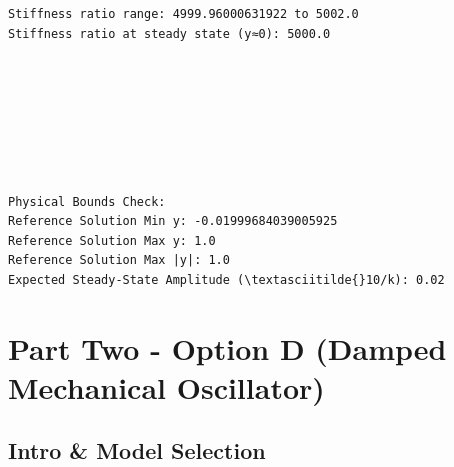 \documentclass[11pt]{article}
\begin{document}
    \begin{Verbatim}[commandchars=\\\{\}]
Stiffness ratio range: 4999.96000631922 to 5002.0
Stiffness ratio at steady state (y≈0): 5000.0
    \end{Verbatim}

    \begin{center}
    \end{center}
    { \hspace*{\fill} \\}
    
    \begin{center}
    \end{center}
    { \hspace*{\fill} \\}
    
    \begin{center}
    \end{center}
    { \hspace*{\fill} \\}
    
    \begin{center}
    \end{center}
    { \hspace*{\fill} \\}
    
    \begin{Verbatim}[commandchars=\\\{\}]
Physical Bounds Check:
Reference Solution Min y: -0.01999684039005925
Reference Solution Max y: 1.0
Reference Solution Max |y|: 1.0
Expected Steady-State Amplitude (\textasciitilde{}10/k): 0.02
    \end{Verbatim}

    \section{Part Two - Option D (Damped Mechanical
Oscillator)}\label{part-two---option-d-damped-mechanical-oscillator}

\subsection{Intro \& Model Selection}\label{intro-model-selection}
\end{document}

